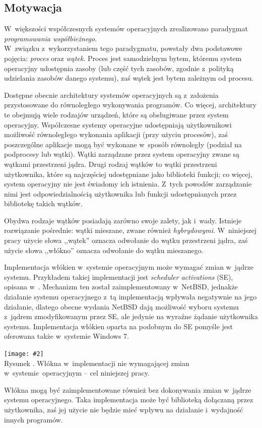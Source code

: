 \documentclass[12pt,makeidx]{mwart}
\newcounter{figmain}
\newcommand{\myownfigure}[4]{ \newcounter{#1} \setcounter{#1}{\value{figmain}} \addtocounter{figmain}{1} \begin{center} \label{fig:#1} \centering \texttt{[image: \#2]}\\ \nopagebreak[4] Rysunek \arabic{#1}. #3. \end{center}}
\begin{document}
\subsection{Motywacja}
\indent
  W~większości współczesnych systemów operacyjnych zrealizowano paradygmat \emph{programowania współbieżnego}.\\
  W~związku z~wykorzystaniem tego paradygmatu, powstały dwa podstawowe pojęcia: \emph{proces} oraz \emph{wątek}.
  Proces jest samodzielnym bytem, któremu system operacyjny udostępnia zasoby (lub część tych zasobów, zgodnie z~polityką udzielania zasobów
  danego systemu), zaś wątek jest bytem zależnym od procesu.
\par
%
\indent
	Dostępne obecnie architektury systemów operacyjnych są z~założenia przystosowane do równoległego
	wykonywania programów. Co więcej, architektury te obejmują wiele rodzajów urządzeń, które są obsługiwane przez system operacyjny.
	Współczesne systemy operacyjne udostępniają użytkownikowi możliwość równoległego wykonania aplikacji (przy użyciu procesów),
	zaś poszczególne aplikacje mogą być wykonane w~sposób równoległy (podział na podprocesy lub wątki). Wątki zarządzane przez system operacyjny
	zwane są wątkami przestrzeni jądra.
	Drugi rodzaj wątków to wątki przestrzeni użytkownika, które są najczęściej udostępniane jako biblioteki funkcji; co więcej, system operacyjny
	nie jest świadomy ich istnienia. Z~tych powodów zarządzanie nimi jest odpowiedzialnością użytkownika lub funkcji udostępnianych przez
	bibliotekę takich wątków.
\par
%
\indent
	Obydwa rodzaje wątków posiadają zarówno swoje zalety, jak i~wady. Istnieje rozwiązanie pośrednie: wątki mieszane, zwane również
	\emph{hybrydowymi}. W~niniejszej pracy użycie słowa ,,wątek'' oznacza odwołanie do wątku przestrzeni jądra, zaś użycie słowa ,,włókno'' oznacza odwołanie
  do wątku mieszanego.
\par
%
\indent
  Implementacja włókien w~systemie operacyjnym może wymagać zmian w~jądrze systemu.
  Przykładem takiej implementacji jest \emph{scheduler activations} (SE), opisana w~\cite{anderson}.
  Mechanizm ten został zaimplementowany w~NetBSD, jednakże działanie systemu operacyjnego z~tą implementacją wpływała negatywnie na jego działanie, 
  dlatego obecne wydania NetBSD dają możliwość wyboru systemu z~jądrem zmodyfikowanym przez SE, ale jedynie na wyraźne żądanie użytkownika systemu.
  Implementacja włókien oparta na podobnym do SE pomyśle jest oferowana także w~systemie Windows 7.
\par
%
\indent
  \myownfigure{mixedintro}{mixedscheme.png}{Włókna w~implementacji nie wymagającej zmian w~systemie~operacyjnym -- cel niniejszej pracy}{.21}
\par
\indent
  Włókna mogą być zaimplementowane również bez dokonywania zmian w~jądrze systemu operacyjnego.
  Taka implementacja może być biblioteką dołączaną przez użytkownika, zaś jej użycie nie będzie mieć wpływu na działanie i~wydajność innych programów.
\par
%
\end{document}
